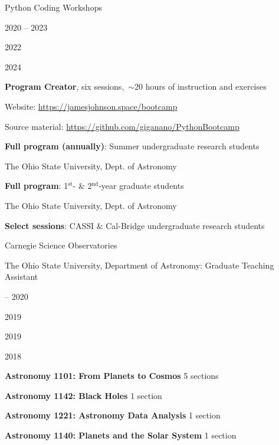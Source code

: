 \documentclass[cv.tex]{subfiles}
\begin{document}
{\color{themecolor} \large Python Coding Workshops}
\par\noindent
\parbox{0.18\textwidth}{%
	\vspace{2mm}
	\raggedleft
	\null \par
	\null \par
	\null \par
	2020 -- 2023 \par
	\null \par
	2022 \par
	\null \par
	2024 \par
	\null
}
\hspace{1mm}
\parbox{0.73\textwidth}{%
	\textbf{Program Creator}, six sessions,~$\sim$20 hours of instruction
	and exercises \par
	Website: {\small \url{https://jamesjohnson.space/bootcamp}} \par
	Source material:
	{\small \url{https://github.com/giganano/PythonBootcamp}} \par
	\textbf{Full program (annually)}: Summer undergraduate research students \par
	The Ohio State University, Dept. of Astronomy \par
	\textbf{Full program}: 1$^\text{st}$- \& 2$^\text{nd}$-year graduate
	students \par
	The Ohio State University, Dept. of Astronomy \par
	\textbf{Select sessions}: CASSI \& Cal-Bridge undergraduate research
	students \par
	Carnegie Science Observatories
}

\vspace{4mm}
\noindent
{\color{themecolor} \large The Ohio State University, Department of Astronomy:
Graduate Teaching Assistant}
\par\noindent
\parbox{0.18\textwidth}{%
	 -- 2020 \par
	2019 \par
	2019 \par
	2018
}
\hspace{1mm}
\parbox{0.8\textwidth}{%
	\vspace{1mm}
	\textbf{Astronomy 1101: From Planets to Cosmos} \hfill 5 sections \par
	\textbf{Astronomy 1142: Black Holes} \hfill 1 section \par
	\textbf{Astronomy 1221: Astronomy Data Analysis} \hfill 1 section \par
	\textbf{Astronomy 1140: Planets and the Solar System} \hfill 1 section \par
}
\end{document}
